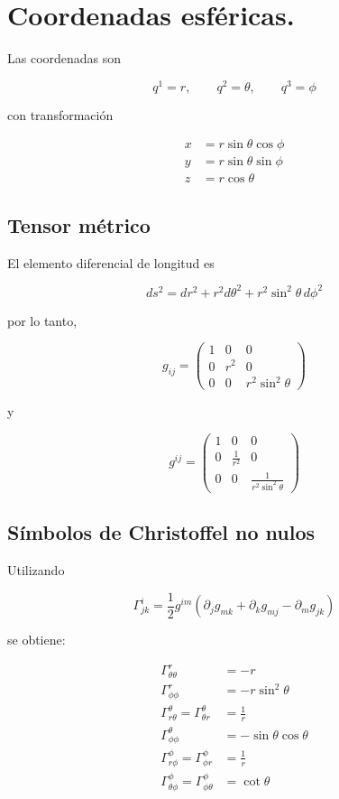 \documentclass[12pt]{article}
\begin{document}
\section{Coordenadas esféricas.}

Las coordenadas son

\[
q^1=r,
\qquad
q^2=\theta,
\qquad
q^3=\phi
\]

con transformación

\begin{align}
x&=r\sin\theta\cos\phi\\
y&=r\sin\theta\sin\phi\\
z&=r\cos\theta
\end{align}

\subsection{Tensor métrico}

El elemento diferencial de longitud es

\[
ds^2=
dr^2+
r^2d\theta^2+
r^2\sin^2\theta\,d\phi^2
\]

por lo tanto,

\[
g_{ij}
=
\begin{pmatrix}
1&0&0\\
0&r^2&0\\
0&0&r^2\sin^2\theta
\end{pmatrix}
\]

y

\[
g^{ij}
=
\begin{pmatrix}
1&0&0\\
0&\frac1{r^2}&0\\
0&0&
\frac1{r^2\sin^2\theta}
\end{pmatrix}
\]

\subsection{Símbolos de Christoffel no nulos}

Utilizando

\[
\Gamma^i_{jk}
=
\frac12
g^{im}
\left(
\partial_jg_{mk}
+
\partial_kg_{mj}
-
\partial_mg_{jk}
\right)
\]

se obtiene:

\begin{align}
\Gamma^r_{\theta\theta}
&=-r
\\
\Gamma^r_{\phi\phi}
&=
-r\sin^2\theta
\\
\Gamma^\theta_{r\theta}
=
\Gamma^\theta_{\theta r}
&=
\frac1r
\\
\Gamma^\theta_{\phi\phi}
&=
-\sin\theta\cos\theta
\\
\Gamma^\phi_{r\phi}
=
\Gamma^\phi_{\phi r}
&=
\frac1r
\\
\Gamma^\phi_{\theta\phi}
=
\Gamma^\phi_{\phi\theta}
&=
\cot\theta
\end{align}
\end{document}
